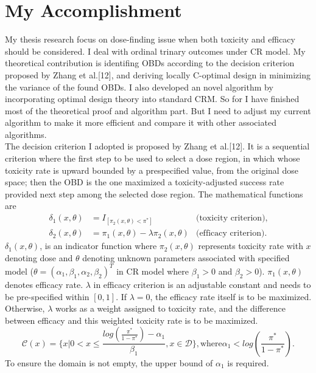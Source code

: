 \documentclass[12pt]{article}
\begin{document}
\section{My Accomplishment}
My thesis research focus on dose-finding issue when both toxicity and efficacy should be considered. I deal with ordinal trinary outcomes under CR model. My theoretical contribution is identifing OBDs according to the decision criterion proposed by Zhang et al.[12], and deriving locally C-optimal design in minimizing the variance of the found OBDs. I also developed an novel algorithm by incorporating optimal design theory into standard CRM. So for I have finished most of the theoretical proof and algorithm part. But I need to adjust my current algorithm to make it more efficient and compare it with other associated algorithms.\\
 The decision criterion I adopted is proposed by Zhang et al.[12]. It is a sequential criterion where the first step to be used to select a dose region, in which whose toxicity rate is upward bounded by a prespecified value, from the original dose space; then the OBD is the one maximized a toxicity-adjusted success rate provided next step among the selected dose region. The mathematical functions are
\begin{equation}
\begin{array}{rlr}
\delta_1(x, \theta)&=I_{[\pi_2(x,\theta)<\pi^*]}& \mbox{(toxicity criterion)},\\
\delta_2(x, \theta)&=\pi_1(x,\theta)-\lambda \pi_2(x,\theta)& \mbox{(efficacy criterion)}.
\end{array}
\end{equation}
 $\delta_1(x,\theta)$, is an indicator function where $\pi_2(x,\theta)$ represents toxicity rate with $x$ denoting dose and $\theta$ denoting unknown parameters associated with specified model ($\theta=(\alpha_1, \beta_1, \alpha_2, \beta_2)^T$ in CR model where $\beta_1>0$ and $\beta_2>0$). $\pi_1(x,\theta)$ denotes efficacy rate. $\lambda$ in efficacy criterion is an adjustable constant and needs to be pre-specified within $[0, 1]$. If $\lambda=0$, the efficacy rate itself is to be maximized. Otherwise, $\lambda$ works as a weight assigned to toxicity rate, and the difference between efficacy and this weighted toxicity rate is to be maximized.
\begin{equation}
    \mathcal{C}(x)=\{x| 0< x\le \frac{log(\frac{\pi^*}{1-\pi^*})-\alpha_1}{\beta_1}, x \in \mathcal{D} \}, \mbox{where}  \alpha_1 < log\left(\frac{\pi^*}{1-\pi^*}\right).
\end{equation}
 To ensure the domain is not empty, the upper bound of $\alpha_1$ is required.
\end{document}
